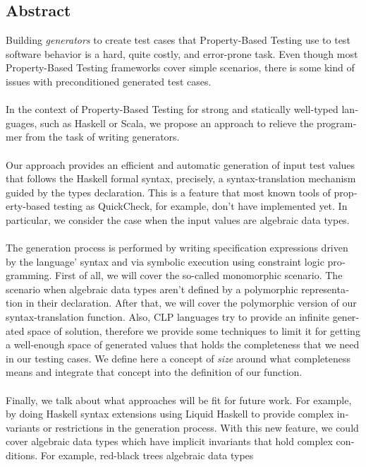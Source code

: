 \begin{otherlanguage}{english}
	\chapter*{Abstract}
	Building \textit{generators} to create test cases that Property-Based Testing use to test software behavior is a hard, quite costly, and error-prone task. Even though most Property-Based Testing frameworks cover simple scenarios, there is some kind of issues with preconditioned generated test cases.
	\\\\
	In the context of Property-Based Testing for strong and statically well-typed languages, such as Haskell or Scala, we propose an approach to relieve the programmer from the task of writing generators.\\\\
	Our approach provides an efficient and automatic generation of input test values that
	follows the Haskell formal syntax, precisely, a syntax-translation mechanism guided by the types declaration. This is a feature that most known tools of property-based testing as QuickCheck, for example, don't have implemented yet. In particular, we consider the case when the input values are algebraic data types.\\\\
	The generation process is performed by writing specification expressions driven by the language' syntax and via symbolic execution using constraint logic programming. First of all, we will cover the so-called monomorphic scenario. The scenario when algebraic data types aren't defined by a polymorphic representation in their declaration. After that, we will cover the polymorphic version of our syntax-translation function. Also, CLP languages try to provide an infinite generated space of solution, therefore we provide some techniques to limit it for getting a well-enough space of generated values that holds the completeness that we need in our testing cases. We define here a concept of \textit{size} around what completeness means and integrate that concept into the definition of our function.\\\\
	Finally, we talk about what approaches will be fit for future work. For example, by doing Haskell syntax extensions using Liquid Haskell to provide complex invariants or restrictions in the generation process. With this new feature, we could cover algebraic data types which have implicit invariants that hold complex conditions. For example, red-black trees algebraic data types
	
\end{otherlanguage}


